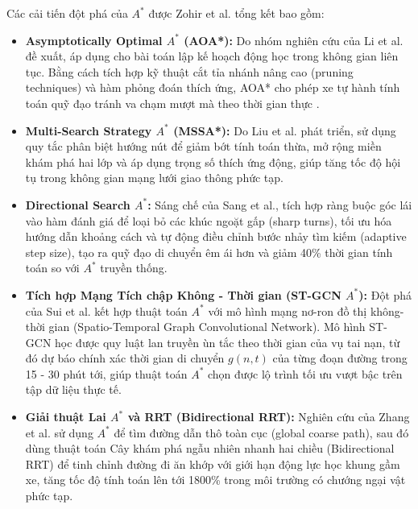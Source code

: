 \documentclass[a4paper]{article}
\begin{document}
Các cải tiến đột phá của $A^*$ được Zohir et al. tổng kết bao gồm:
\begin{itemize}
    \item \textbf{Asymptotically Optimal $A^*$ (AOA*):} Do nhóm nghiên cứu của Li et al. đề xuất, áp dụng cho bài toán lập kế hoạch động học trong không gian liên tục. Bằng cách tích hợp kỹ thuật cắt tỉa nhánh nâng cao (pruning techniques) và hàm phỏng đoán thích ứng, AOA* cho phép xe tự hành tính toán quỹ đạo tránh va chạm mượt mà theo thời gian thực \cite{zohir2025nature}.
    \item \textbf{Multi-Search Strategy $A^*$ (MSSA*):} Do Liu et al. phát triển, sử dụng quy tắc phân biệt hướng nút để giảm bớt tính toán thừa, mở rộng miền khám phá hai lớp và áp dụng trọng số thích ứng động, giúp tăng tốc độ hội tụ trong không gian mạng lưới giao thông phức tạp.
    \item \textbf{Directional Search $A^*$:} Sáng chế của Sang et al., tích hợp ràng buộc góc lái vào hàm đánh giá để loại bỏ các khúc ngoặt gấp (sharp turns), tối ưu hóa hướng dẫn khoảng cách và tự động điều chỉnh bước nhảy tìm kiếm (adaptive step size), tạo ra quỹ đạo di chuyển êm ái hơn và giảm 40\% thời gian tính toán so với $A^*$ truyền thống.
    \item \textbf{Tích hợp Mạng Tích chập Không - Thời gian (ST-GCN $A^*$):} Đột phá của Sui et al. kết hợp thuật toán $A^*$ với mô hình mạng nơ-ron đồ thị không-thời gian (Spatio-Temporal Graph Convolutional Network). Mô hình ST-GCN học được quy luật lan truyền ùn tắc theo thời gian của vụ tai nạn, từ đó dự báo chính xác thời gian di chuyển $g(n, t)$ của từng đoạn đường trong 15 - 30 phút tới, giúp thuật toán $A^*$ chọn được lộ trình tối ưu vượt bậc trên tập dữ liệu thực tế.
    \item \textbf{Giải thuật Lai $A^*$ và RRT (Bidirectional RRT):} Nghiên cứu của Zhang et al. sử dụng $A^*$ để tìm đường dẫn thô toàn cục (global coarse path), sau đó dùng thuật toán Cây khám phá ngẫu nhiên nhanh hai chiều (Bidirectional RRT) để tinh chỉnh đường đi ăn khớp với giới hạn động lực học khung gầm xe, tăng tốc độ tính toán lên tới 1800\% trong môi trường có chướng ngại vật phức tạp.
\end{itemize}
\end{document}
